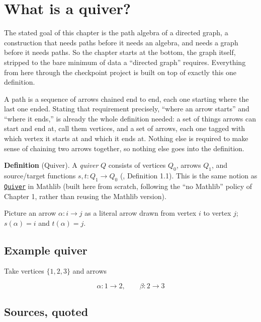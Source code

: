 \section{What is a quiver?}\label{sec:12-path-algebras:01-what-is-a-quiver:1}

The stated goal of this chapter is the path algebra of a directed graph, a construction that needs paths before it needs an algebra, and needs a graph before it needs paths. So the chapter starts at the bottom, the graph itself, stripped to the bare minimum of data a ``directed graph'' requires. Everything from here through the checkpoint project is built on top of exactly this one definition.

A path is a sequence of arrows chained end to end, each one starting where the last one ended. Stating that requirement precisely, ``where an arrow starts'' and ``where it ends,'' is already the whole definition needed: a set of things arrows can start and end at, call them vertices, and a set of arrows, each one tagged with which vertex it starts at and which it ends at. Nothing else is required to make sense of chaining two arrows together, so nothing else goes into the definition.

\textbf{Definition} (Quiver). A \emph{quiver} \(Q\) consists of vertices \(Q_0\), arrows \(Q_1\), and source/target functions \(s, t : Q_1 \to Q_0\) (\cite{AssemSimsonSkowronski2006}, Definition 1.1). This is the same notion as \href{https://loogle.lean-lang.org/?q=Quiver}{\texttt{Quiver}} in Mathlib (built here from scratch, following the ``no Mathlib'' policy of Chapter 1, rather than reusing the Mathlib version).

Picture an arrow \(\alpha : i \to j\) as a literal arrow drawn from vertex \(i\) to vertex \(j\); \(s(\alpha) = i\) and \(t(\alpha) = j\).

\subsection{Example quiver}\label{sec:12-path-algebras:01-what-is-a-quiver:2}

Take vertices \(\{1, 2, 3\}\) and arrows

\[
\alpha : 1 \to 2, \qquad \beta : 2 \to 3
\]

\subsection{Sources, quoted}\label{sec:12-path-algebras:01-what-is-a-quiver:3}

